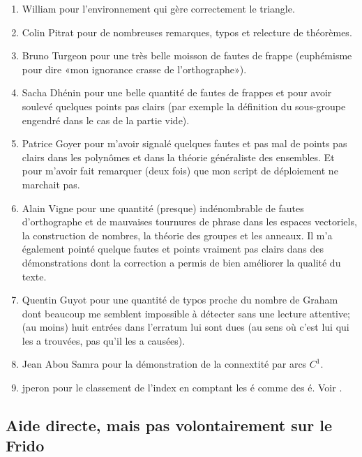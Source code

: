 \begin{enumerate}
	\item
	      William pour l'environnement  qui gère correctement le triangle.
	\item
	      Colin Pitrat pour de nombreuses remarques, typos et relecture de théorèmes.
	\item
	      Bruno Turgeon pour une très belle moisson de fautes de frappe (euphémisme pour dire «mon ignorance crasse de l'orthographe»).
	\item
	      Sacha Dhénin pour une belle quantité de fautes de frappes et pour avoir soulevé quelques points pas clairs (par exemple la définition du sous-groupe engendré dans le cas de la partie vide).
	\item
	      Patrice Goyer pour m'avoir signalé quelques fautes et pas mal de points pas clairs dans les polynômes et dans la théorie généraliste des ensembles. Et pour m'avoir fait remarquer (deux fois) que mon script de déploiement ne marchait pas.
	\item
	      Alain Vigne pour une quantité (presque) indénombrable de fautes d'orthographe et de mauvaises tournures de phrase dans les espaces vectoriels, la construction de nombres, la théorie des groupes et les anneaux. Il m'a également pointé quelque fautes et points vraiment pas clairs dans des démonstrations dont la correction a permis de bien améliorer la qualité du texte.
	\item
	      Quentin Guyot pour une quantité de typos proche du nombre de Graham dont beaucoup me semblent impossible à détecter sans une lecture attentive; (au moins) huit entrées dans l'erratum lui sont dues (au sens où c'est lui qui les a trouvées, pas qu'il les a causées).
	\item
	      Jean Abou Samra pour la démonstration de la connextité par arcs \( C^1\).
	\item
	      jperon pour le classement de l'index en comptant les é comme des é. Voir \cite{BIBooHVJLooVHqAss}.
\end{enumerate}

\subsection{Aide directe, mais pas volontairement sur le Frido}

